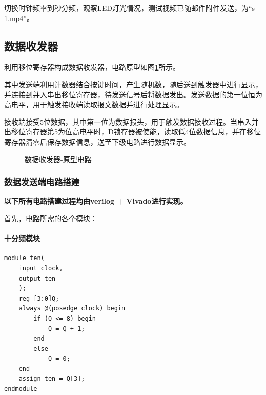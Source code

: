 \documentclass[UTF8]{ctexart}
\numberwithin{figure}{subsection}
\numberwithin{table}{subsection}
\numberwithin{equation}{subsection}
\begin{document}
\par 切换时钟频率到秒分频，观察LED灯光情况，测试视频已随邮件附件发送，为“s-1.mp4”。

\subsection{数据收发器}
利用移位寄存器构成数据收发器，电路原型如图\ref{DataSR circuit prototype}所示。
\par 其中发送端利用计数器结合按键时间，产生随机数，随后送到触发器中进行显示，并连接到并入串出移位寄存器，待发送信号后将数据发出。发送数据的第一位恒为高电平，用于触发接收端读取报文数据并进行处理显示。
\par 接收端接受5位数据，其中第一位为数据报头，用于触发数据接收过程。当串入并出移位寄存器第5为位高电平时，D锁存器被使能，读取低4位数据信息，并在移位寄存器清零后保存数据信息，送至下级电路进行数据显示。

\begin{figure}[H]
    \centering
    \caption{数据收发器-原型电路}
    \label{DataSR circuit prototype}
\end{figure}


\subsubsection{数据发送端电路搭建}
\par {\color{red}\textbf{以下所有电路搭建过程均由verilog + Vivado进行实现。}}
\par 首先，电路所需的各个模块：
\paragraph{十分频模块}
\begin{lstlisting}[style={verilog-style}]
module ten(
    input clock,
    output ten
    );
    reg [3:0]Q;
    always @(posedge clock) begin
        if (Q <= 8) begin
            Q = Q + 1;
        end
        else
            Q = 0;
    end
    assign ten = Q[3];
endmodule
\end{lstlisting}
\end{document}
